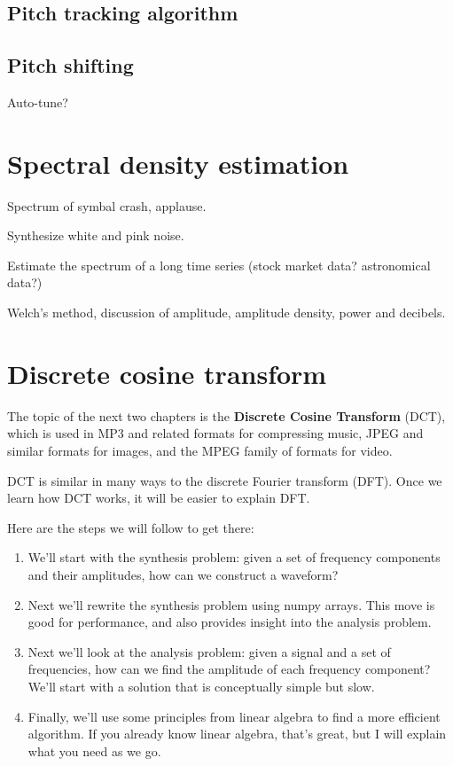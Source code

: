 \documentclass[12pt]{book}
\begin{document}
\section{Pitch tracking algorithm}

\section{Pitch shifting}

Auto-tune?


\chapter{Spectral density estimation}

Spectrum of symbal crash, applause.

Synthesize white and pink noise.

Estimate the spectrum of a long time series (stock market data?
astronomical data?)

Welch's method, discussion of amplitude, amplitude density, power
and decibels.


\chapter{Discrete cosine transform}

The topic of the next two chapters is the {\bf Discrete Cosine
  Transform} (DCT), which is used in MP3 and related formats for
compressing music, JPEG and similar formats for images, and the MPEG
family of formats for video.

DCT is similar in many ways to the discrete Fourier transform (DFT).
Once we learn how DCT works, it will be easier to explain DFT.

Here are the steps we will follow to get there:

\begin{enumerate}

\item We'll start with the synthesis problem: given a set of frequency
  components and their amplitudes, how can we construct a waveform?

\item Next we'll rewrite the synthesis problem using numpy arrays.
  This move is good for performance, and also provides insight
  into the analysis problem.

\item Next we'll look at the analysis problem: given a signal and a
  set of frequencies, how can we find the amplitude of each frequency
  component?  We'll start with a solution that is conceptually simple
  but slow.

\item Finally, we'll use some principles from linear algebra to find a
  more efficient algorithm.  If you already know linear algebra,
  that's great, but I will explain what you need as we go.

\end{enumerate}
\end{document}
